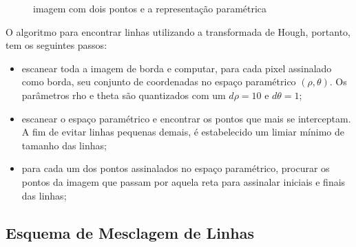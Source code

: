 \begin{figure}[h]
  \centering
  \hfill
  \caption{imagem com dois pontos e a representação paramétrica}
  \label{houghlinhas}
\end{figure}


O algoritmo para encontrar linhas utilizando a transformada de Hough, portanto, tem os seguintes passos: 
\begin{itemize}
\item escanear toda a imagem de borda e computar, para cada pixel assinalado como borda, seu conjunto de coordenadas no espaço paramétrico $(\rho,\theta)$. Os parâmetros rho e theta são quantizados com um $d\rho = 10$ e $d\theta = 1$;
\item escanear o espaço paramétrico e encontrar os pontos que mais se interceptam. A fim de evitar linhas pequenas demais, é estabelecido um limiar mínimo de tamanho das linhas;
\item para cada um dos pontos assinalados no espaço paramétrico, procurar os pontos da imagem que passam por aquela reta para assinalar iniciais e finais das linhas;
\end{itemize}

\subsection{Esquema de Mesclagem de Linhas}

